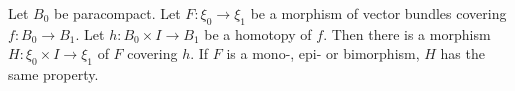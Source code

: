 Let $B_0$ be paracompact. Let $F: \xi_0 \to \xi_1$ be a morphism of vector bundles covering $f: B_0 \to B_1$. Let $h: B_0 \times I \to B_1$ be a homotopy of $f$. Then there is a morphism $H: \xi_0 \times I \to \xi_1$ of $F$ covering $h$. If $F$ is a mono-, epi- or bimorphism, $H$ has the same property.
